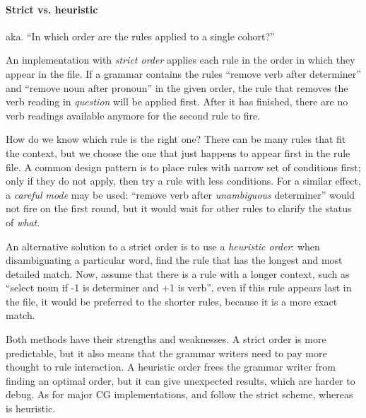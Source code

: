 \paragraph{Strict vs. heuristic}

aka. ``In which order are the rules applied to a single cohort?''

An implementation with \emph{strict order} applies each rule in the order in 
which they appear in the file. If a grammar contains the rules ``remove verb after determiner'' and ``remove noun after pronoun'' in the given order, the rule that removes the verb reading in \emph{question} will be applied first. After it has finished, there are no verb readings available anymore for the second rule to fire.
					
How do we know which rule is the right one? There can be many rules that fit the context, but we choose the one that just happens to appear first in the rule file. 
A common design pattern is to place rules with narrow set of conditions first; 
only if they do not apply, then try a rule with less conditions. For a similar effect,
a \emph{careful mode} may be used: ``remove verb after \emph{unambiguous} determiner'' 
would not fire on the first round, but it would wait for other rules to clarify the
status of \emph{what}.


					
An alternative solution to a strict order is to use a \emph{heuristic order}: when disambiguating a particular word, find the rule that has the longest and most detailed match. Now, assume that there is a rule with a longer context, such as ``select noun if -1 is determiner and +1 is verb'', even if this rule appears last in the file, it would be preferred to the shorter rules, because it is a more exact match.
					
Both methods have their strengths and weaknesses. A strict order is more predictable, but it also means that the grammar writers need to pay more thought to rule interaction. A heuristic order frees the grammar writer from finding an optimal order, but it can give unexpected results, which are harder to debug.
As for major CG implementations, \cite{karlsson1990cgp} and \cite{vislcg3} follow the strict scheme, whereas \cite{tapanainen1996} is heuristic.


